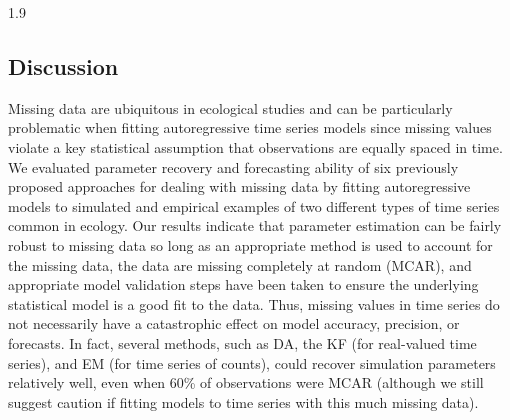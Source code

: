 \documentclass[12pt,english]{article} %
\begin{document}
\begin{linenumbers}
\begin{spacing}{1.9}
\begin{flushleft}
\section*{Discussion}
\vspace{-1.5em}
\hspace{1em} Missing data are ubiquitous in ecological studies and can be particularly problematic when fitting autoregressive time series models since missing values violate a key statistical assumption that observations are equally spaced in time. We evaluated parameter recovery and forecasting ability of six previously proposed approaches for dealing with missing data by fitting autoregressive models to simulated and empirical examples of two different types of time series common in ecology. Our results indicate that parameter estimation can be fairly robust to missing data so long as an appropriate method is used to account for the missing data, the data are missing completely at random (MCAR), and appropriate model validation steps have been taken to ensure the underlying statistical model is a good fit to the data. Thus, missing values in time series do not necessarily have a catastrophic effect on model accuracy, precision, or forecasts. In fact, several methods, such as DA, the KF (for real-valued time series), and EM (for time series of counts), could recover simulation parameters relatively well, even when 60\% of observations were MCAR (although we still suggest caution if fitting models to time series with this much missing data). 


\end{flushleft}
\end{spacing}
\end{linenumbers}
\end{document}
